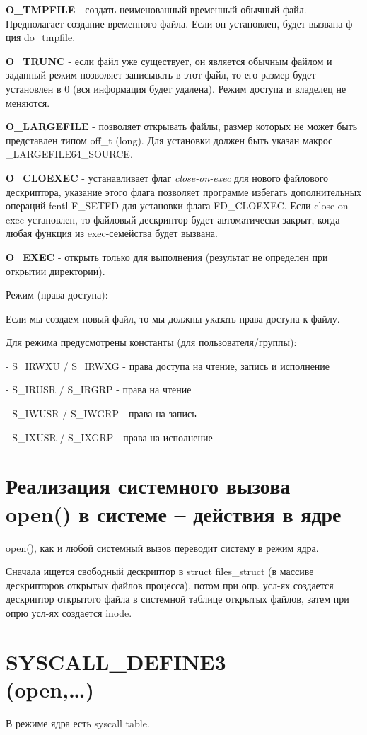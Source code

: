 \textbf{O\_TMPFILE} - создать неименованный временный обычный файл. Предполагает создание временного файла. Если он установлен, будет вызвана ф-ция do\_tmpfile.

\textbf{O\_TRUNC} - если файл уже существует, он является обычным файлом и заданный режим позволяет записывать в этот файл, то его размер будет установлен в 0 (вся информация будет удалена). Режим доступа и владелец не меняются.

\textbf{O\_LARGEFILE} - позволяет открывать файлы, размер которых не может
быть представлен типом off\_t (long). Для установки должен быть указан макрос 
\_LARGEFILE64\_SOURCE.

\textbf{O\_CLOEXEC} - устанавливает флаг \textit{close-on-exec} для нового файлового дескриптора, указание этого флага позволяет программе избегать дополнительных операций fcntl F\_SETFD для установки флага FD\_CLOEXEC. Если close-on-exec установлен, то файловый дескриптор будет автоматически закрыт, когда любая функция из exec-семейства будет вызвана.

\textbf{O\_EXEC} - открыть только для выполнения (результат не определен при открытии директории).

Режим (права доступа): 

Если мы создаем новый файл, то мы должны указать права доступа к файлу. 

Для режима предусмотрены константы (для пользователя/группы):

-  S\_IRWXU / S\_IRWXG - права доступа на чтение, запись и исполнение

- S\_IRUSR / S\_IRGRP - права на чтение

- S\_IWUSR / S\_IWGRP - права на запись

- S\_IXUSR / S\_IXGRP - права на исполнение

\section{Реализация системного вызова open() в системе – действия в ядре}
open(), как и любой системный вызов переводит систему в режим ядра.

Сначала ищется свободный дескриптор в struct files\_struct (в массиве дескрипторов открытых файлов процесса), потом при опр. усл-ях создается дескриптор открытого файла в системной таблице открытых файлов, затем при опрю усл-ях создается inode.

\section{SYSCALL\_DEFINE3 \\ (open,…)}
В режиме ядра есть syscall table.

